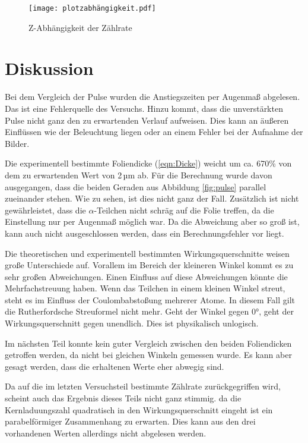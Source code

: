 \begin{figure}[H]
  \centering
  \texttt{[image: plotzabhängigkeit.pdf]}
  \caption{Z-Abhängigkeit der Zählrate}
  \label{fig:zabhängigkeit}
\end{figure}

\section{Diskussion}

Bei dem Vergleich der Pulse wurden die Anstiegszeiten per Augenmaß abgelesen.
Das ist eine Fehlerquelle des Versuchs.
Hinzu kommt, dass die unverstärkten Pulse nicht ganz den zu erwartenden Verlauf aufweisen.
Dies kann an äußeren Einflüssen wie der Beleuchtung liegen oder an einem Fehler bei der Aufnahme der Bilder.

Die experimentell bestimmte Foliendicke (\ref{eqn:Dicke}) weicht um ca. 670\% von dem zu erwartenden Wert von
2\,µm ab. Für die Berechnung wurde davon ausgegangen,
dass die beiden Geraden aus Abbildung \ref{fig:pulse} parallel zueinander stehen.
Wie zu sehen, ist dies nicht ganz der Fall.
Zusätzlich ist nicht gewährleistet, dass die $\alpha$-Teilchen nicht schräg auf die Folie treffen,
da die Einstellung nur per Augenmaß möglich war.
Da die Abweichung aber so groß ist, kann auch nicht ausgeschlossen werden, dass ein Berechnungsfehler vor liegt.

Die theoretischen und experimentell bestimmten Wirkungsquerschnitte weisen große Unterschiede auf.
Vorallem im Bereich der kleineren Winkel kommt es zu sehr großen Abweichungen.
Einen Einfluss auf diese Abweichungen könnte die Mehrfachstreuung haben.
Wenn das Teilchen in einem kleinen Winkel streut, steht es im Einfluss der Coulombabstoßung mehrerer Atome.
In diesem Fall gilt die Rutherfordsche Streuformel nicht mehr.
Geht der Winkel gegen 0°, geht der Wirkungsquerschnitt gegen unendlich.
Dies ist physikalisch unlogisch.

Im nächsten Teil konnte kein guter Vergleich zwischen den beiden Foliendicken getroffen werden, da nicht bei gleichen Winkeln gemessen wurde.
Es kann aber gesagt werden, dass die erhaltenen Werte eher abwegig sind.

Da auf die im letzten Versuchsteil bestimmte Zählrate zurückgegriffen wird, scheint auch das Ergebnis dieses Teils nicht ganz stimmig.
da die Kernladuungszahl quadratisch in den Wirkungsquerschnitt eingeht ist ein parabelförmiger Zusammenhang zu erwarten.
Dies kann aus den drei vorhandenen Werten allerdings nicht abgelesen werden.
